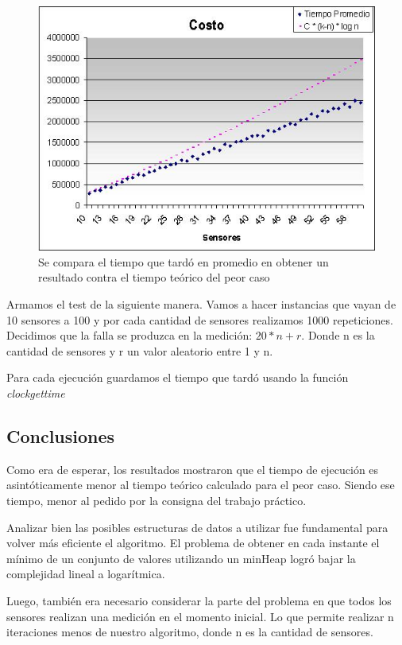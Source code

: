 \quad


\begin{figure}[H]
	\centering
	\includegraphics[scale=0.8]{ej2.jpg}
	\caption{ Se compara el tiempo que tard\'o en promedio en obtener un resultado contra el tiempo te\'orico del peor caso}
\end{figure}



\quad Armamos el test de la siguiente manera. Vamos a hacer instancias que vayan de 10 sensores a 100 y por cada cantidad de sensores realizamos 1000 repeticiones. Decidimos que la falla se produzca en la medici\'on: \quad $20 * n + r $. Donde n es la cantidad de sensores y r un valor aleatorio entre 1 y n.

\quad Para cada ejecuci\'on guardamos el tiempo que tard\'o usando la funci\'on \textit{clockgettime}


\subsection{Conclusiones}

\quad Como era de esperar, los resultados mostraron que el tiempo de ejecuci\'on es asint\'oticamente menor al tiempo te\'orico calculado para el peor caso. Siendo ese tiempo, menor al pedido por la consigna del trabajo pr\'actico.

\quad

\quad Analizar bien las posibles estructuras de datos a utilizar fue fundamental para volver m\'as eficiente el algoritmo. El problema de obtener en cada instante el m\'inimo de un conjunto de valores utilizando un minHeap logr\'o bajar la complejidad lineal a logar\'itmica.

\quad

\quad Luego, tambi\'en era necesario considerar la parte del problema en que todos los sensores realizan una medici\'on en el momento inicial. Lo que permite realizar n iteraciones menos de nuestro algoritmo, donde n es la cantidad de sensores.
